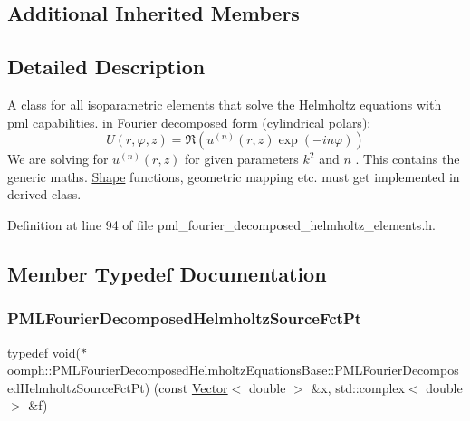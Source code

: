 \subsection*{Additional Inherited Members}


\subsection{Detailed Description}
A class for all isoparametric elements that solve the Helmholtz equations with pml capabilities. in Fourier decomposed form (cylindrical polars)\+: \[ U(r,\varphi,z) = \Re( u^{(n)}(r,z) \exp(-i n \varphi)) \] We are solving for $ u^{(n)}(r,z)$ for given parameters $ k^2 $ and $ n $ . This contains the generic maths. \hyperlink{classoomph_1_1Shape}{Shape} functions, geometric mapping etc. must get implemented in derived class. 

Definition at line 94 of file pml\+\_\+fourier\+\_\+decomposed\+\_\+helmholtz\+\_\+elements.\+h.



\subsection{Member Typedef Documentation}
\mbox{\label{classoomph_1_1PMLFourierDecomposedHelmholtzEquationsBase_a2e749d98392af2109b41dca0ae618b79}} 
\subsubsection{\texorpdfstring{P\+M\+L\+Fourier\+Decomposed\+Helmholtz\+Source\+Fct\+Pt}{PMLFourierDecomposedHelmholtzSourceFctPt}}
{\footnotesize\ttfamily typedef void($\ast$ oomph\+::\+P\+M\+L\+Fourier\+Decomposed\+Helmholtz\+Equations\+Base\+::\+P\+M\+L\+Fourier\+Decomposed\+Helmholtz\+Source\+Fct\+Pt) (const \hyperlink{classoomph_1_1Vector}{Vector}$<$ double $>$ \&x, std\+::complex$<$ double $>$ \&f)}



